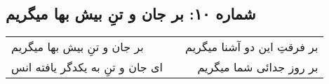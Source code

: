 \begin{center}
\section*{شماره ۱۰: بر جان و تنِ بیش بها میگریم}
\label{sec:010}
\begin{longtable}{l p{0.5cm} r}
بر جان و تنِ بیش بها میگریم
&&
بر فرقتِ این دو آشنا میگریم
\\
ای جان و تنِ به یکدگر یافته انس
&&
بر روز جدائی شما میگریم
\\
\end{longtable}
\end{center}

